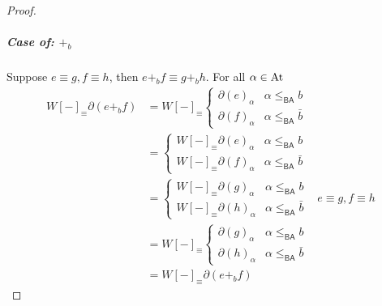 \documentclass[a4paper,UKenglish,cleveref, autoref, thm-restate]{lipics-v2021}
\newcommand{\At}{\text{\upshape{At}}}
\newcommand{\BA}{\textsf{BA}}
\theoremstyle{plain}\newtheoremrep{thm}{Theorem}[section]
\begin{document}
\begin{toappendix}
\begin{proof}
			\subparagraph*{Case of: $+_b$}
			Suppose $e \equiv g, f\equiv h$, then $e +_b f \equiv g +_b h$. For all $\alpha \in \At$\begin{align*}
				W[-]_\equiv\partial(e+_b f) &= W[-]_\equiv\begin{cases}
					\partial(e)_\alpha & \alpha \leq_{\BA} b\\
					\partial(f)_\alpha & \alpha \leq_{\BA} \bar b
				\end{cases}\\
				&= \begin{cases}
					W[-]_\equiv\partial(e)_\alpha & \alpha \leq_{\BA} b\\
					W[-]_\equiv\partial(f)_\alpha & \alpha \leq_{\BA} \bar b
				\end{cases}  \\
				&= \begin{cases}
					W[-]_\equiv\partial(g)_\alpha & \alpha \leq_{\BA} b\\
					W[-]_\equiv\partial(h)_\alpha & \alpha \leq_{\BA} \bar b
				\end{cases} & e \equiv g, f \equiv h\\
				&= W[-]_\equiv\begin{cases}
					\partial(g)_\alpha & \alpha \leq_{\BA} b\\
					\partial(h)_\alpha & \alpha \leq_{\BA} \bar b
				\end{cases} \\
				 &=W[-]_\equiv\partial(e+_b f)
			\end{align*}
			

\end{proof}
\end{toappendix}
\end{document}
